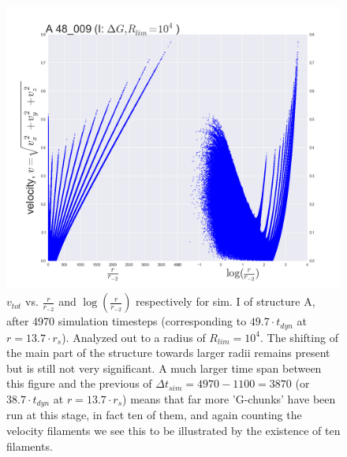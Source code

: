 \begin{figure}[!htbp]
\centering
\includegraphics[width=1.0\linewidth]{img/A_48_009_v_logr_r2.png}
\caption{$v_{tot}$ vs. $\frac{r}{r_{-2}}$ and $\log (\frac{r}{r_{-2}})$ respectively for sim. I of structure A, after 4970 simulation timesteps (corresponding to $49.7\cdot t_{dyn}$ at $r=13.7\cdot r_s$). Analyzed out to a radius of $R_{lim} = 10^4$. The shifting of the main part of the structure towards larger radii remains present but is still not very significant. A much larger time span between this figure and the previous of $\Delta t_{sim} = 4970-1100 = 3870$ (or $38.7\cdot t_{dyn}$ at $r=13.7\cdot r_s$) means that far more 'G-chunks' have been run at this stage, in fact ten of them, and again counting the velocity filaments we see this to be illustrated by the existence of ten filaments.}
\label{fig:test}
\end{figure}

